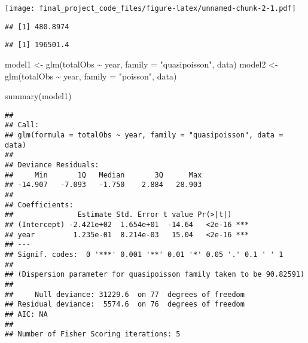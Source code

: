 \documentclass[
]{article}
\newenvironment{Shaded}{\begin{snugshade}}{\end{snugshade}}
\newcommand{\AttributeTok}[1]{\textcolor[rgb]{0.77,0.63,0.00}{#1}}
\newcommand{\CommentTok}[1]{\textcolor[rgb]{0.56,0.35,0.01}{\textit{#1}}}
\newcommand{\FunctionTok}[1]{\textcolor[rgb]{0.00,0.00,0.00}{#1}}
\newcommand{\NormalTok}[1]{#1}
\newcommand{\OtherTok}[1]{\textcolor[rgb]{0.56,0.35,0.01}{#1}}
\newcommand{\SpecialCharTok}[1]{\textcolor[rgb]{0.00,0.00,0.00}{#1}}
\newcommand{\StringTok}[1]{\textcolor[rgb]{0.31,0.60,0.02}{#1}}
\begin{document}
\texttt{[image: final\_project\_code\_files/figure-latex/unnamed-chunk-2-1.pdf]}

\begin{Shaded}
\end{Shaded}

\begin{verbatim}
## [1] 480.8974
\end{verbatim}

\begin{Shaded}
\end{Shaded}

\begin{verbatim}
## [1] 196501.4
\end{verbatim}

\begin{Shaded}
\begin{Highlighting}[]
\NormalTok{model1 }\OtherTok{\textless{}{-}} \FunctionTok{glm}\NormalTok{(totalObs }\SpecialCharTok{\textasciitilde{}}\NormalTok{ year, }\AttributeTok{family =} \StringTok{"quasipoisson"}\NormalTok{, data)}
\NormalTok{model2 }\OtherTok{\textless{}{-}} \FunctionTok{glm}\NormalTok{(totalObs }\SpecialCharTok{\textasciitilde{}}\NormalTok{ year, }\AttributeTok{family =} \StringTok{"poisson"}\NormalTok{, data)}

\FunctionTok{summary}\NormalTok{(model1)}
\end{Highlighting}
\end{Shaded}

\begin{verbatim}
## 
## Call:
## glm(formula = totalObs ~ year, family = "quasipoisson", data = data)
## 
## Deviance Residuals: 
##     Min       1Q   Median       3Q      Max  
## -14.907   -7.093   -1.750    2.884   28.903  
## 
## Coefficients:
##               Estimate Std. Error t value Pr(>|t|)    
## (Intercept) -2.421e+02  1.654e+01  -14.64   <2e-16 ***
## year         1.235e-01  8.214e-03   15.04   <2e-16 ***
## ---
## Signif. codes:  0 '***' 0.001 '**' 0.01 '*' 0.05 '.' 0.1 ' ' 1
## 
## (Dispersion parameter for quasipoisson family taken to be 90.82591)
## 
##     Null deviance: 31229.6  on 77  degrees of freedom
## Residual deviance:  5574.6  on 76  degrees of freedom
## AIC: NA
## 
## Number of Fisher Scoring iterations: 5
\end{verbatim}
\end{document}
